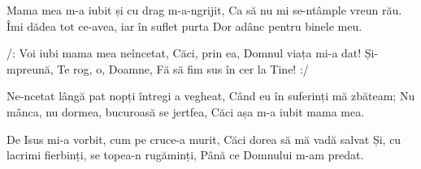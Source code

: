 \beginverse
Mama mea m-a iubit și cu drag m-a-ngrijit,
Ca să nu mi se-ntâmple vreun rău.
Îmi dădea tot ce-avea, iar în suflet purta
Dor adânc pentru binele meu.
\endverse

\beginchorus
/: Voi iubi mama mea neîncetat,
Căci, prin ea, Domnul viața mi-a dat!
Și-mpreună, Te rog, o, Doamne,
Fă să fim sus în cer la Tine! :/
\endchorus

\beginverse
Ne-ncetat lângă pat nopți întregi a vegheat,
Când eu în suferinți mă zbăteam;
Nu mânca, nu dormea, bucuroasă se jertfea,
Căci așa m-a iubit mama mea.
\endverse

\beginverse
De Isus mi-a vorbit, cum pe cruce-a murit,
Căci dorea să mă vadă salvat
Și, cu lacrimi fierbinți, se topea-n rugăminți,
Până ce Domnului m-am predat.
\endverse
\endsong